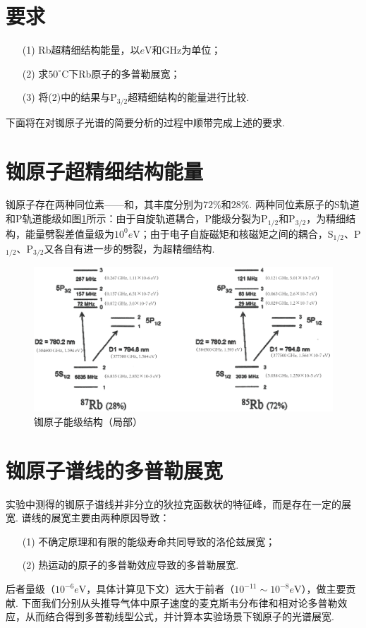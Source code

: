 \documentclass{assignment}
\begin{document}
\section*{要求}
\begin{itemize}
    \item[(1)] Rb超精细结构能量，以$e$V和GHz为单位；
    \item[(2)] 求$50^{\circ}$C下Rb原子的多普勒展宽；
    \item[(3)] 将(2)中的结果与P$_{3/2}$超精细结构的能量进行比较.
\end{itemize}
下面将在对铷原子光谱的简要分析的过程中顺带完成上述的要求.

\section{铷原子超精细结构能量}
铷原子存在两种同位素——和，其丰度分别为$72\%$和$28\%$. 两种同位素原子的S轨道和P轨道能级如图\ref{Rb-energy-level}所示：由于自旋轨道耦合，P能级分裂为P$_{1/2}$和P$_{3/2}$，为精细结构，能量劈裂差值量级为$10^0 e$V；由于电子自旋磁矩和核磁矩之间的耦合，S$_{1/2}$、P$_{1/2}$、P$_{3/2}$又各自有进一步的劈裂，为超精细结构.
\begin{figure}[h]
    \centering
    \includegraphics[width=.9\textwidth]{Rb-energy-level-1.png}
    \caption{铷原子能级结构（局部）}
    \label{Rb-energy-level}
\end{figure}

\section{铷原子谱线的多普勒展宽}
实验中测得的铷原子谱线并非分立的狄拉克函数状的特征峰，而是存在一定的展宽. 谱线的展宽主要由两种原因导致：
\begin{itemize}
    \item[(1)] 不确定原理和有限的能级寿命共同导致的洛伦兹展宽；
    \item[(2)] 热运动的原子的多普勒效应导致的多普勒展宽.
\end{itemize}
后者量级（$10^{-6}e$V，具体计算见下文）远大于前者（$10^{-11}\sim 10^{-8}e$V），做主要贡献. 下面我们分别从头推导气体中原子速度的麦克斯韦分布律和相对论多普勒效应，从而结合得到多普勒线型公式，并计算本实验场景下铷原子的光谱展宽.
\end{document}
